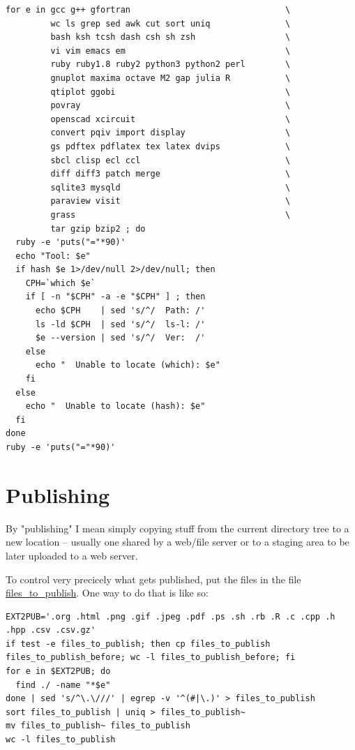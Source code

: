 \documentclass[11pt]{article}
\begin{document}
\begin{verbatim}
for e in gcc g++ gfortran                               \
         wc ls grep sed awk cut sort uniq               \
         bash ksh tcsh dash csh sh zsh                  \
         vi vim emacs em                                \
         ruby ruby1.8 ruby2 python3 python2 perl        \
         gnuplot maxima octave M2 gap julia R           \
         qtiplot ggobi                                  \
         povray                                         \
         openscad xcircuit                              \
         convert pqiv import display                    \
         gs pdftex pdflatex tex latex dvips             \
         sbcl clisp ecl ccl                             \
         diff diff3 patch merge                         \
         sqlite3 mysqld                                 \
         paraview visit                                 \
         grass                                          \
         tar gzip bzip2 ; do
  ruby -e 'puts("="*90)'
  echo "Tool: $e"
  if hash $e 1>/dev/null 2>/dev/null; then 
    CPH=`which $e`
    if [ -n "$CPH" -a -e "$CPH" ] ; then
      echo $CPH    | sed 's/^/  Path: /'
      ls -ld $CPH  | sed 's/^/  ls-l: /'
      $e --version | sed 's/^/  Ver:  /'
    else
      echo "  Unable to locate (which): $e"
    fi
  else
    echo "  Unable to locate (hash): $e"
  fi
done
ruby -e 'puts("="*90)'
\end{verbatim}

\section{Publishing}
\label{sec:orgfeb8b3b}
By "publishing" I mean simply copying stuff from the current directory tree to a new location -- usually one shared by a web/file server or to a staging area
to be later uploaded to a web server.

To control very precicely what gets published, put the files in the file \url{files\_to\_publish}.  One way to do that is like so:

\begin{verbatim}
EXT2PUB='.org .html .png .gif .jpeg .pdf .ps .sh .rb .R .c .cpp .h .hpp .csv .csv.gz'
if test -e files_to_publish; then cp files_to_publish files_to_publish_before; wc -l files_to_publish_before; fi
for e in $EXT2PUB; do
  find ./ -name "*$e"
done | sed 's/^\.\///' | egrep -v '^(#|\.)' > files_to_publish
sort files_to_publish | uniq > files_to_publish~
mv files_to_publish~ files_to_publish
wc -l files_to_publish
\end{verbatim}
\end{document}
